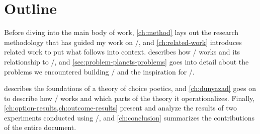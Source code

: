 \section{Outline}

Before diving into the main body of work, \cref{ch:method} lays out the research methodology that has guided my work on \dunyazad/, and \cref{ch:related-work} introduces related work to put what follows into context.
%
 describes how \skald/ works and its relationship to \minstrel/, and \cref{sec:problem-planets-problems} goes into detail about the problems we encountered building \problemplanets/ and the inspiration for \dunyazad/.


 describes the foundations of a theory of choice poetics, and \cref{ch:dunyazad} goes on to describe how \dunyazad/ works and which parts of the theory it operationalizes.
%
Finally, \cref{ch:option-results,ch:outcome-results} present and analyze the results of two experiments conducted using \dunyazad/, and \cref{ch:conclusion} summarizes the contributions of the entire document.
